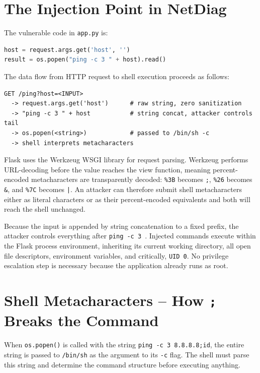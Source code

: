 \vspace{0.3cm}

\section{The Injection Point in NetDiag}

The vulnerable code in \texttt{app.py} is:

\begin{lstlisting}[language=Python]
host = request.args.get('host', '')
result = os.popen("ping -c 3 " + host).read()
\end{lstlisting}

The data flow from HTTP request to shell execution proceeds as follows:

\begin{lstlisting}
GET /ping?host=<INPUT>
  -> request.args.get('host')      # raw string, zero sanitization
  -> "ping -c 3 " + host           # string concat, attacker controls tail
  -> os.popen(<string>)            # passed to /bin/sh -c
  -> shell interprets metacharacters
\end{lstlisting}

Flask uses the Werkzeug WSGI library for request parsing. Werkzeug performs URL-decoding before the value reaches the view function, meaning percent-encoded metacharacters are transparently decoded: \texttt{\%3B} becomes \texttt{;}, \texttt{\%26} becomes \texttt{\&}, and \texttt{\%7C} becomes \texttt{|}. An attacker can therefore submit shell metacharacters either as literal characters or as their percent-encoded equivalents and both will reach the shell unchanged.

Because the input is appended by string concatenation to a fixed prefix, the attacker controls everything after \texttt{ping -c 3 }. Injected commands execute within the Flask process environment, inheriting its current working directory, all open file descriptors, environment variables, and critically, \texttt{UID 0}. No privilege escalation step is necessary because the application already runs as root.

\vspace{0.3cm}

\section{Shell Metacharacters -- How \texttt{;} Breaks the Command}

When \texttt{os.popen()} is called with the string \texttt{ping -c 3 8.8.8.8;id}, the entire string is passed to \texttt{/bin/sh} as the argument to its \texttt{-c} flag. The shell must parse this string and determine the command structure before executing anything.

